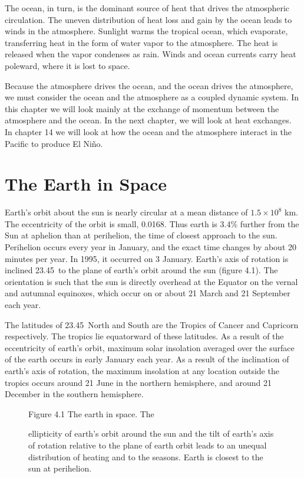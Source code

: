 The ocean, in turn, is the dominant source of heat that drives the
atmospheric circulation. The uneven distribution of heat loss and gain by the ocean
leads to winds in the atmosphere.  Sunlight warms the tropical ocean,
which evaporate, transferring heat in the form of water vapor to the
atmosphere. The heat is released when the vapor condenses as
rain. Winds and ocean currents carry heat poleward, where it is lost
to space.

Because the atmosphere drives the ocean, and the ocean drives the
atmosphere, we must consider the ocean and the atmosphere as a coupled
dynamic system. In this chapter we will look mainly at the exchange of
momentum between the atmosphere and the ocean. In the next chapter, we
will look at heat exchanges. In chapter 14 we will look at how the
ocean and the atmosphere interact in the Pacific to produce El
Ni\~{n}o.

\section{The Earth in Space}
Earth's orbit about the sun is nearly
circular at a mean distance of \(1.5 \times 10^8\) km. The
eccentricity of the orbit is small, 0.0168.  Thus earth is 3.4\%
further from the Sun at aphelion than at perihelion, the
time of closest approach to the sun. Perihelion occurs every year in
January, and the exact time changes by about 20 minutes per year. In
1995, it occurred on 3 January. Earth's axis of rotation is inclined
23.45\degrees\ to the plane of earth's orbit around the sun
(figure 4.1). The orientation is such that the sun
is directly overhead at the Equator on the vernal and autumnal
equinoxes, which occur on or about 21 March and 21 September each
year.

The latitudes of 23.45\degrees\ North and South are the Tropics of
Cancer and Capricorn respectively. The tropics lie equatorward of
these latitudes. As a result of the eccentricity of earth's orbit,
maximum solar insolation averaged over the
surface of the earth occurs in early January each year. As a result of
the inclination of earth's axis of rotation, the maximum insolation at
any location outside the tropics occurs around 21 June in the northern
hemisphere, and around 21 December in the southern hemisphere.

\begin{figure}[t!]
\footnotesize
Figure 4.1 The earth in space. The \rule{0mm}{3ex}ellipticity of
earth's orbit around the sun and the tilt of earth's axis
of rotation relative to the plane of earth orbit leads to an unequal
distribution of heating and to the seasons. Earth is closest to the
sun at perihelion.
\label{fig:earthinspace}
\vspace{-4ex}
\end{figure}

